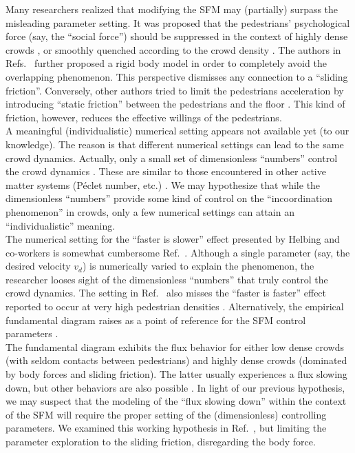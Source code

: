 \documentclass[preprint,12pt]{elsarticle}
\begin{document}
Many researchers realized that modifying the SFM may (partially) surpass the 
misleading parameter setting. It was proposed that the pedestrians' 
psychological force (say, the ``social force'') should be suppressed in the 
context of highly dense crowds 
\cite{pelechano_2007,moussaid_2011,alonso_2014,bottinelli_2017}, or smoothly 
quenched according to the crowd density \cite{song_2019}. The authors in 
Refs.~\cite{kabalan_2017,jebrane_2019} further proposed a rigid body model in 
order to completely avoid the overlapping phenomenon. This perspective 
dismisses 
any connection to a ``sliding friction''. Conversely, other authors tried to 
limit the pedestrians acceleration by introducing ``static friction'' between 
the pedestrians and the floor \cite{wang_2019}. This kind of friction, however, 
reduces the effective willings of the pedestrians.  \\  

A meaningful (individualistic) numerical setting appears not available yet (to 
our knowledge). The reason is that different numerical settings can lead to 
the same crowd dynamics. Actually, only a small set of dimensionless 
``numbers'' control the crowd dynamics \cite{dorso_2019}. These are similar to 
those encountered in other active matter systems (P\'eclet number, etc.)  
\cite{marchetti_2014}. We may hypothesize that while the dimensionless 
``numbers'' provide some kind of control on the ``incoordination phenomenon'' 
in 
crowds, only a few numerical settings can attain an ``individualistic'' 
meaning. 
 \\

The numerical setting for the ``faster is slower'' effect presented by 
Helbing and co-workers is somewhat cumbersome 
Ref.~\cite{helbing_2000,dorso_2017,dorso_2019}. Although a single 
parameter (say, the desired velocity $v_d$) is numerically varied to 
explain the phenomenon, the researcher looses sight of the dimensionless 
``numbers'' that truly control the crowd dynamics. The setting in 
Ref.~\cite{helbing_2000} also misses the ``faster is faster'' effect reported 
to occur at very high pedestrian densities \cite{dorso_2017,haghani_2019}. 
Alternatively, the empirical fundamental diagram raises as a point of reference 
for the SFM control parameters \cite{helbing_2007,dorso_2017}. \\

The fundamental diagram exhibits the flux behavior for either low dense crowds 
(with seldom contacts between pedestrians) and highly dense crowds (dominated 
by 
body forces and sliding friction). The latter usually experiences a flux 
slowing 
down, but other behaviors are also possible \cite{helbing_2007,lohner_2018}. In 
light of our previous hypothesis, we may suspect that the  modeling of the 
``flux slowing down'' within the context of the SFM will require the proper 
setting of the (dimensionless) controlling parameters. We examined this working 
hypothesis in Ref.~\cite{dorso_2019}, but limiting the parameter exploration to 
the sliding friction, disregarding the body force. \\
\end{document}
